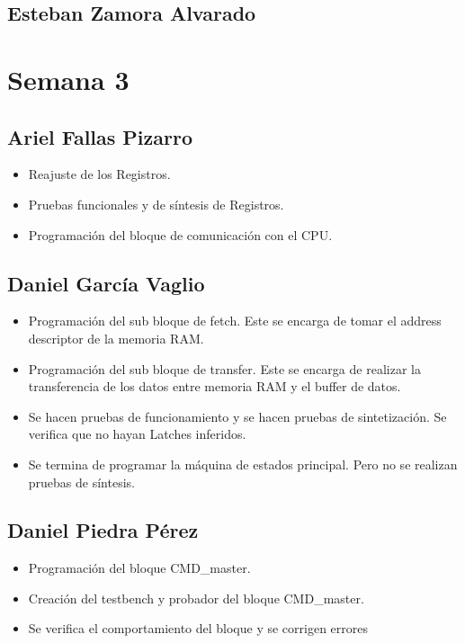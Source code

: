 \subsection{Esteban Zamora Alvarado}

\newpage
\section{Semana 3}
\subsection{Ariel Fallas Pizarro}
\begin{itemize}
\item Reajuste de los Registros.
\item Pruebas funcionales y de síntesis de Registros.
\item Programación del bloque de comunicación con el CPU.
\end{itemize}

\subsection{Daniel García Vaglio}
\begin{itemize}
\item Programación del sub bloque de fetch. Este se encarga de tomar el address descriptor de la
  memoria RAM. 
\item Programación del sub bloque de transfer. Este se encarga de realizar la transferencia de los
  datos entre memoria RAM y el buffer de datos. 
\item Se hacen pruebas de funcionamiento y se hacen pruebas de sintetización. Se verifica que no
  hayan Latches inferidos. 
\item Se termina de programar la máquina de estados principal. Pero no se realizan pruebas de
  síntesis.  
\end{itemize}

\subsection{Daniel Piedra Pérez}
\begin{itemize}
\item Programación del bloque CMD\_master.
\item Creación del testbench y probador del bloque CMD\_master.
\item Se verifica el comportamiento del bloque y se corrigen errores
\end{itemize}

